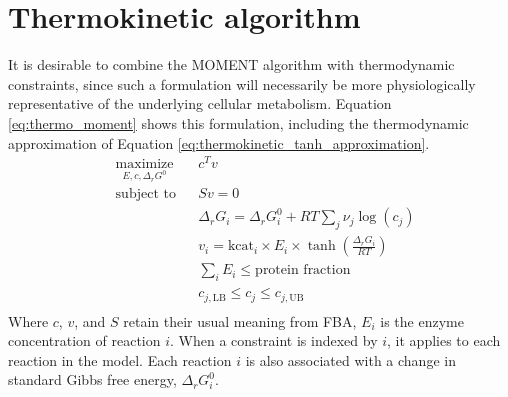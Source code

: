 \section{Thermokinetic algorithm}
It is desirable to combine the MOMENT algorithm \cite{adadi2012prediction} with thermodynamic
constraints, since such a formulation will necessarily be more physiologically representative
of the underlying cellular metabolism. Equation \ref{eq:thermo_moment} shows this formulation,
including the thermodynamic approximation of Equation \ref{eq:thermokinetic_tanh_approximation}.
\begin{equation}
\begin{aligned}
& \underset{E, c, \Delta_r G^0}{\text{maximize}}
& & c^T v \\
& \text{subject to}
& & S v = 0 \\
& & & \Delta_r G_i = \Delta_r G_i^0 + R T \sum_j\nu_j\log\left(c_j \right) \\
& & & v_i = \text{kcat}_i \times E_i \times \tanh \left(\frac{\Delta_r G_i}{RT} \right)\\
& & & \sum_i E_i \leq \text{protein fraction}\\
& & & c_{j, \text{LB}} \leq c_j \leq c_{j, \text{UB}}\\
\end{aligned}
\label{eq:thermo_moment}
\end{equation}
Where $c$, $v$, and $S$ retain their usual meaning from FBA, $E_i$ is the enzyme
concentration of reaction $i$. When a constraint is indexed by $i$, it applies to each
reaction in the model. Each reaction $i$ is also associated with a change in standard Gibbs free
energy, $\Delta_r G_i^0$.